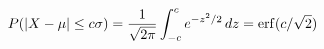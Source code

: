 \documentclass[preview]{standalone}
\begin{document}
\begin{align*}
\special{dvisvgm:raw <g id='unique000'>}P(|X-\mu|\le c\sigma)=\frac{1}{\sqrt{2\pi}}\int_{-c}^{c}e^{-z^2/2}\,dz=\operatorname{erf}(c/\sqrt2)\special{dvisvgm:raw </g>}
\end{align*}
\end{document}
